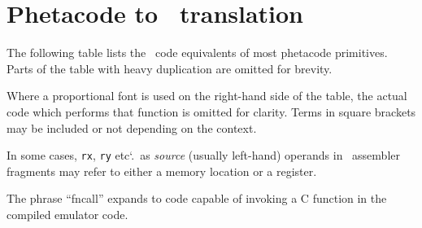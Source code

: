 \chapter{Phetacode to \ia\ translation}

The following table lists the \ia\ code equivalents of most phetacode primitives. Parts of the table with heavy duplication are omitted for brevity.

Where a proportional font is used on the right-hand side of the table, the actual code which performs that function is omitted for clarity. Terms in square brackets may be included or not depending on the context.

In some cases, {\tt rx}, {\tt ry} etc\char`.\ as {\it source} (usually left-hand) operands in \ia\ assembler fragments may refer to either a memory location or a register.

The phrase ``fncall'' expands to code capable of invoking a C function in the compiled emulator code.


